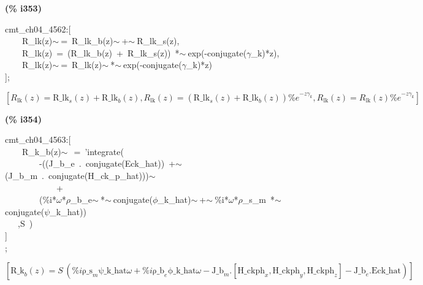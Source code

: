 \documentclass[fleqn]{article}
\begin{document}
\noindent
\begin{minipage}[t]{4.000000em}\color{red}\bfseries
(\% i353)	
\end{minipage}
\begin{minipage}[t]{\textwidth}\color{blue}
cmt\_ch04\_4562:[\\
\ \ \ \ R\_lk(z)\ensuremath{\sim\ }=\ R\_lk\_b(z)\ensuremath{\sim\ }+\ensuremath{\sim\ }R\_lk\_s(z),\\
\ \ \ \ R\_lk(z)\ =\ (R\_lk\_b(z)\ +\ R\_lk\_s(z))\ *\ensuremath{\sim\ }exp(-conjugate(\ensuremath{\gamma}\_k)*z),\\
\ \ \ \ R\_lk(z)\ensuremath{\sim\ }=\ R\_lk(z)\ensuremath{\sim\ }*\ensuremath{\sim\ }exp(-conjugate(\ensuremath{\gamma}\_k)*z)\\
];
\end{minipage}
\[\displaystyle \tag{\% o353} 
\left[ {R_{\ensuremath{\mathrm{lk}}}}(z)={{\ensuremath{\mathrm{R\_ lk}}}_s}(z)+{{\ensuremath{\mathrm{R\_ lk}}}_b}(z)\operatorname{,}{R_{\ensuremath{\mathrm{lk}}}}(z)=\left( {{\ensuremath{\mathrm{R\_ lk}}}_s}(z)+{{\ensuremath{\mathrm{R\_ lk}}}_b}(z)\right)  {{\% e}^{-z {{\gamma }_k}}}\operatorname{,}{R_{\ensuremath{\mathrm{lk}}}}(z)={R_{\ensuremath{\mathrm{lk}}}}(z) {{\% e}^{-z {{\gamma }_k}}}\right] \mbox{}
\]


\noindent
\begin{minipage}[t]{4.000000em}\color{red}\bfseries
(\% i354)	
\end{minipage}
\begin{minipage}[t]{\textwidth}\color{blue}
cmt\_ch04\_4563:[\\
\ \ \ \ R\_k\_b(z)\ensuremath{\sim\ }\ =\ 'integrate(\ \\
\ \ \ \ \ \ \ \ -((J\_b\_e\ .\ conjugate(Eck\_hat))\ +\ensuremath{\sim\ }(J\_b\_m\ .\ conjugate(H\_ck\_p\_hat)))\ensuremath{\sim\ }\\
\ \ \ \ \ \ \ \ \ \ \ \ +\\
\ \ \ \ \ \ \ \ (\%i*\ensuremath{\omega}*\ensuremath{\rho}\_b\_e\ensuremath{\sim\ }*\ensuremath{\sim\ }conjugate(\ensuremath{\phi}\_k\_hat)\ensuremath{\sim\ }+\ensuremath{\sim\ }\%i*\ensuremath{\omega}*\ensuremath{\rho}\_s\_m\ *\ensuremath{\sim\ }conjugate(\ensuremath{\psi}\_k\_hat))\\
\ \ \ ,S\ )\\
]\\
;
\end{minipage}
\[\displaystyle \tag{\% o354} 
\operatorname{[}{{\ensuremath{\mathrm{R\_ k}}}_b}(z)=S\, \left( \% i {{\ensuremath{\mathrm{\rho \_ s}}}_m} \ensuremath{\mathrm{\psi \_ k\_ hat}} \omega +\% i {{\ensuremath{\mathrm{\rho \_ b}}}_e} \ensuremath{\mathrm{\phi \_ k\_ hat}} \omega -{{\ensuremath{\mathrm{J\_ b}}}_m}\ensuremath{\mathrm{ . }}\left[ {{\ensuremath{\mathrm{H\_ ckph}}}_x}\operatorname{,}{{\ensuremath{\mathrm{H\_ ckph}}}_y}\operatorname{,}{{\ensuremath{\mathrm{H\_ ckph}}}_z}\right] -{{\ensuremath{\mathrm{J\_ b}}}_e}\ensuremath{\mathrm{ . }}\ensuremath{\mathrm{Eck\_ hat}}\right) \operatorname{]}\mbox{}
\]
\end{document}
